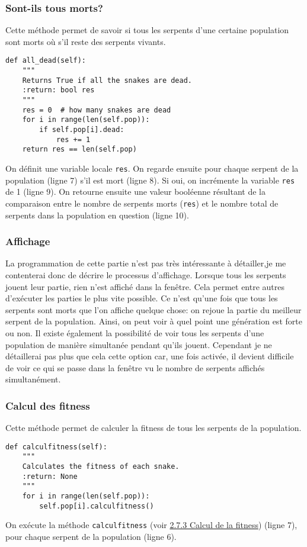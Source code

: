 \documentclass[12pt, a4paper, openany]{book}
\begin{document}
\subsubsection{Sont-ils tous morts?}
Cette méthode permet de savoir si tous les serpents d'une certaine population sont morts où s'il reste des serpents vivants.
\begin{verbatim}
def all_dead(self):
    """
    Returns True if all the snakes are dead.
    :return: bool res
    """
    res = 0  # how many snakes are dead
    for i in range(len(self.pop)):
        if self.pop[i].dead:
            res += 1
    return res == len(self.pop)
\end{verbatim}
On définit une variable locale \verb'res'. On regarde ensuite pour chaque serpent de la population (ligne 7) s'il est mort (ligne 8). Si oui, on incrémente la variable \verb'res' de 1 (ligne 9). On retourne ensuite une valeur booléenne résultant de la comparaison entre le nombre de serpents morts (\verb'res') et le nombre total de serpents dans la population en question (ligne 10). 

\subsubsection{Affichage}
La programmation de cette partie n'est pas très intéressante à détailler,je me contenterai donc de décrire le processus d'affichage.\newline
Lorsque tous les serpents jouent leur partie, rien n'est affiché dans la fenêtre. Cela permet entre autres d'exécuter les parties le plus vite possible. Ce n'est qu'une fois que tous les serpents sont morts que l'on affiche quelque chose: on rejoue la partie du meilleur serpent de la population. Ainsi, on peut voir à quel point une génération est forte ou non.\newline
Il existe également la possibilité de voir tous les serpents d'une population de manière simultanée pendant qu'ils jouent. Cependant je ne détaillerai pas plus que cela cette option car, une fois activée, il devient difficile de voir ce qui se passe dans la fenêtre vu le nombre de serpents affichés simultanément.

\subsubsection{Calcul des fitness}
\label{r:2.7.6-cal}
Cette méthode permet de calculer la fitness de tous les serpents de la population.
\begin{verbatim}
def calculfitness(self):
    """
    Calculates the fitness of each snake.
    :return: None
    """
    for i in range(len(self.pop)):
        self.pop[i].calculfitness()
\end{verbatim}
On exécute la méthode \verb'calculfitness' (voir \hyperref[r:2.7.3-fit]{2.7.3 Calcul de la fitness}) (ligne 7), pour chaque serpent de la population (ligne 6).
\end{document}
